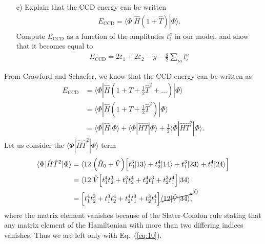 \documentclass[a4paper]{article}
\newcommand{\eq} [1]{Eq.\ (\ref{eq:#1})}
\newcommand{\nn}{\nonumber}
\begin{document}
\begin{exframe}
\begin{itemize}
  \item[c)] Explain that the CCD energy can be written 
  \begin{align}
  E_\text{CCD} = \langle \Phi | \hat H(1+\hat T)|\Phi\rangle. \label{eq:10}
  \end{align}
  Compute $E_\text{CCD}$ as a function of the amplitudes $t^a_i$ in our model, and show that it becomes equal to 
  \begin{align}
  E_\text{CCD} = 2\varepsilon_1 + 2\varepsilon_2 - g - \frac{g}{2}\sum_{ia}t^a_i
  \end{align}
\end{itemize}
\end{exframe}
From Crawford and Schaefer, we know that the CCD energy can be written as
\begin{align}
E_\text{CCD} &= \langle \Phi | \hat H \left(1+  \hat T + \frac{1}{2}\hat T^2 + \dots \right) | \Phi \rangle \nn\\
%
&= \langle \Phi | \hat H \left(1+  \hat T + \frac{1}{2}\hat T^2 \right) | \Phi \rangle \nn\\
%
&= \langle \Phi | \hat H |\Phi\rangle + \langle \Phi | \hat H \hat T|\Phi\rangle + \frac{1}{2}\langle \Phi | \hat H\hat T^2 |\Phi\rangle.
\end{align}
Let us consider the $\langle \Phi | \hat H\hat T^2 |\Phi\rangle$ term
\begin{align}
\langle \Phi | \hat H\hat T^2 |\Phi\rangle &= \langle 12 | \Big(\hat H_0 + \hat V\Big) \Big[ t^3_2|13\rangle + t^4_2|14\rangle + t^3_1|23\rangle + t^4_1|24\rangle \Big] \nn\\
%
&= \langle 12 | \hat V \Big[ t_1^4t^3_2 + t_1^3t^4_2 + t^4_2t^3_1 + t_2^3t^4_1 \Big] |34\rangle \nn\\
%
&= \Big[ t_1^4t^3_2 + t_1^3t^4_2 + t^4_2t^3_1 + t_2^3t^4_1 \Big]  \cancelto{0}{\langle 12 | \hat V |34\rangle },
\end{align}
where the matrix element vanishes because of the Slater-Condon rule stating that any matrix element of the Hamiltonian with more than two differing indices vanishes. Thus we are left only with \eq{10}.
\end{document}
